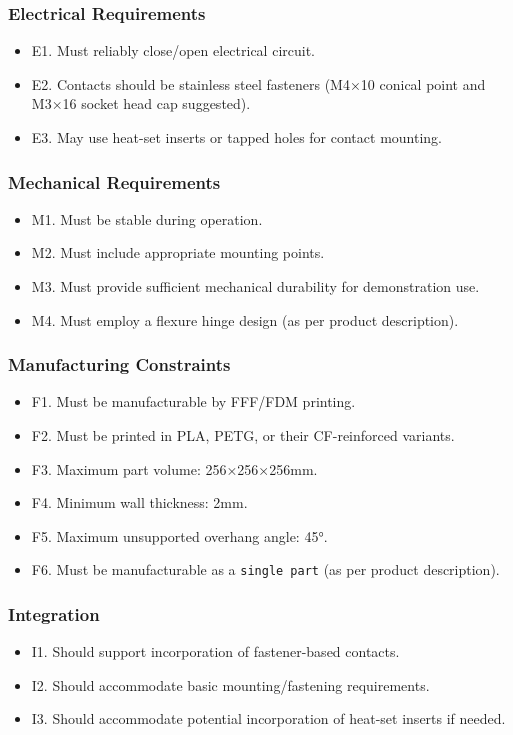 \documentclass[10pt]{article}
\begin{document}
\subsubsection{Electrical Requirements}
\begin{itemize}[leftmargin=*]
	\item E1. Must reliably close/open electrical circuit.
	\item E2. Contacts should be stainless steel fasteners (M4×10 conical point and M3×16 socket head cap
	      suggested).
	\item E3. May use heat-set inserts or tapped holes for contact mounting.
\end{itemize}

\subsubsection{Mechanical Requirements}
\begin{itemize}[leftmargin=*]
	\item M1. Must be stable during operation.
	\item M2. Must include appropriate mounting points.
	\item M3. Must provide sufficient mechanical durability for demonstration use.
	\item M4. Must employ a flexure hinge design (as per product description).
\end{itemize}

\subsubsection{Manufacturing Constraints}
\begin{itemize}[leftmargin=*]
	\item F1. Must be manufacturable by FFF/FDM printing.
	\item F2. Must be printed in PLA, PETG, or their CF-reinforced variants.
	\item F3. Maximum part volume: 256×256×256mm.
	\item F4. Minimum wall thickness: 2mm.
	\item F5. Maximum unsupported overhang angle: 45°.
	\item F6. Must be manufacturable as a \texttt{single part} (as per product description).
\end{itemize}

\subsubsection{Integration}
\begin{itemize}[leftmargin=*]
	\item I1. Should support incorporation of fastener-based contacts.
	\item I2. Should accommodate basic mounting/fastening requirements.
	\item I3. Should accommodate potential incorporation of heat-set inserts if needed.
\end{itemize}
\end{document}
